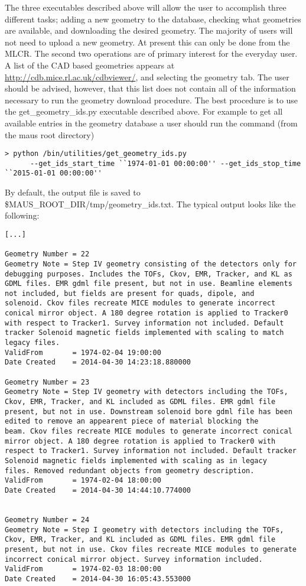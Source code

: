 The three executables described above will allow the user to
accomplish three different tasks; adding a new geometry to the
database, checking what geometries are available, and downloading the
desired geometry. The majority of users will not need to upload a new
geometry. At present this can only be done from the MLCR. The second
two operations are of primary interest for the everyday user. A list
of the CAD based geometries appears at
\url{http://cdb.mice.rl.ac.uk/cdbviewer/}, and selecting the geometry
tab. The user should be advised, however, that this list does not
contain all of the information necessary to run the geometry download
procedure. The best procedure is to use the get\_geometry\_ids.py
executable described above. For example to get all available entries
in the geometry database a user should run the command (from the maus
root directory)
\begin{verbatim}
> python /bin/utilities/get_geometry_ids.py 
      --get_ids_start_time ``1974-01-01 00:00:00'' --get_ids_stop_time ``2015-01-01 00:00:00''
\end{verbatim}
By default, the output file is saved to
\$MAUS_ROOT_DIR/tmp/geometry_ids.txt. The typical output looks like
the following:
\begin{verbatim}
[...]

Geometry Number = 22
Geometry Note = Step IV geometry consisting of the detectors only for
debugging purposes. Includes the TOFs, Ckov, EMR, Tracker, and KL as
GDML files. EMR gdml file present, but not in use. Beamline elements
not included, but fields are present for quads, dipole, and
solenoid. Ckov files recreate MICE modules to generate incorrect
conical mirror object. A 180 degree rotation is applied to Tracker0
with respect to Tracker1. Survey information not included. Default
tracker Solenoid magnetic fields implemented with scaling to match
legacy files.
ValidFrom       = 1974-02-04 19:00:00
Date Created    = 2014-04-30 14:23:18.880000

Geometry Number = 23
Geometry Note = Step IV geometry with detectors including the TOFs,
Ckov, EMR, Tracker, and KL included as GDML files. EMR gdml file
present, but not in use. Downstream solenoid bore gdml file has been
edited to remove an appearent piece of material blocking the
beam. Ckov files recreate MICE modules to generate incorrect conical
mirror object. A 180 degree rotation is applied to Tracker0 with
respect to Tracker1. Survey information not included. Default tracker
Solenoid magnetic fields implemented with scaling as in legacy
files. Removed redundant objects from geometry description.
ValidFrom       = 1974-02-04 18:00:00
Date Created    = 2014-04-30 14:44:10.774000


Geometry Number = 24
Geometry Note = Step I geometry with detectors including the TOFs,
Ckov, EMR, Tracker, and KL included as GDML files. EMR gdml file
present, but not in use. Ckov files recreate MICE modules to generate
incorrect conical mirror object. Survey information included.
ValidFrom       = 1974-02-03 18:00:00
Date Created    = 2014-04-30 16:05:43.553000

\end{verbatim}
